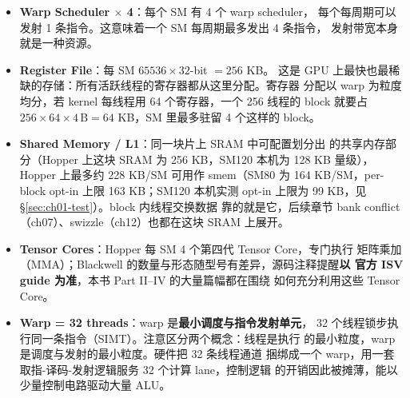 \begin{itemize}
\item \textbf{Warp Scheduler $\times$ 4}：每个 SM 有 4 个 warp scheduler，
  每个每周期可以发射 1 条指令。这意味着一个 SM 每周期最多发出 4 条指令，
  发射带宽本身就是一种资源。
\item \textbf{Register File}：每 SM $65536 \times 32$-bit $= 256$ KB。
  这是 GPU 上最快也最稀缺的存储：所有活跃线程的寄存器都从这里分配。寄存器
  分配以 warp 为粒度均分，若 kernel 每线程用 64 个寄存器，一个 256 线程的
  block 就要占 $256 \times 64 \times 4\,\mathrm{B} = 64$ KB，SM 里最多驻留
  4 个这样的 block。
\item \textbf{Shared Memory / L1}：同一块片上 SRAM 中可配置划分出
  的共享内存部分（Hopper 上这块 SRAM 为 256 KB，SM120 本机为 128 KB 量级），
  Hopper 上最多约 228 KB/SM 可用作 smem（SM80 为 164 KB/SM，per-block
  opt-in 上限 163 KB；SM120 本机实测
  opt-in 上限为 99 KB，见 \S\ref{sec:ch01-test}）。block 内线程交换数据
  靠的就是它，后续章节 bank conflict（ch07）、swizzle（ch12）也都在这块
  SRAM 上展开。
\item \textbf{Tensor Cores}：Hopper 每 SM 4 个第四代 Tensor Core，专门执行
  矩阵乘加（MMA）；Blackwell 的数量与形态随型号有差异，源码注释提醒\textbf{以
  官方 ISV guide 为准}，本书 Part II--IV 的大量篇幅都在围绕
  如何充分利用这些 Tensor Core。
\item \textbf{Warp = 32 threads}：warp 是\textbf{最小调度与指令发射单元}，
  32 个线程锁步执行同一条指令（SIMT）。注意区分两个概念：线程是执行
  的最小粒度，warp 是调度与发射的最小粒度。硬件把 32 条线程通道
  捆绑成一个 warp，用一套取指-译码-发射逻辑服务 32 个计算 lane，控制逻辑
  的开销因此被摊薄，能以少量控制电路驱动大量 ALU。
\end{itemize}

